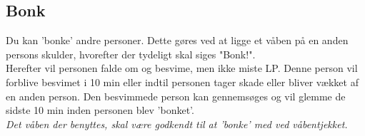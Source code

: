 \subsection{Bonk}
Du kan 'bonke' andre personer. Dette gøres ved at ligge et våben på en anden persons skulder, hvorefter der tydeligt skal siges "Bonk!".\\
Herefter vil personen falde om og besvime, men ikke miste LP. Denne person vil forblive besvimet i 10 min eller indtil personen tager skade eller bliver vækket af en anden person. Den besvimmede person kan gennemsøges og vil glemme de sidste 10 min inden personen blev 'bonket'.\\
\emph{Det våben der benyttes, skal være godkendt til at 'bonke' med ved våbentjekket.}\\